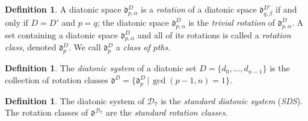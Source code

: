 \documentclass{article}
\theoremstyle{plain}
\theoremstyle{definition}
\newtheorem{definition}[theorem]{Definition}
\theoremstyle{remark}
\begin{document}
\begin{definition}
\label{DEF.Rotation}
	A diatonic space $\mathfrak{d}_{p,\alpha}^D$ is a \textit{rotation} of a diatonic space $\mathfrak{d}_{q,\beta}^{D'}$ if and only if $D=D'$ and $p=q$; the diatonic space $\mathfrak{d}_{p,\alpha}^D$ is the \textit{trivial rotation} of $\mathfrak{d}_{p,\alpha}^D$. A set containing a diatonic space $\mathfrak{d}_{p,\alpha}^D$ and all of its rotations is called a \textit{rotation class}, denoted $\mathfrak{d}_p^D$. We call $\mathfrak{d}_p^D$ a \textit{class of $p$ths}.
\end{definition}

\begin{definition}
\label{DEF.Diatonic System}
	The \textit{diatonic system} of a diatonic set $D=\{d_0,\dots,d_{n-1}\}$ is the collection of rotation classes $\mathfrak{d}^D=\{\mathfrak{d}_p^D\,|\,\gcd{(p-1,n)}=1\}$.
\end{definition}

\begin{definition}
\label{DEF.SDS}
	The diatonic system of $\mathcal{D}_7$ is the \textit{standard diatonic system} (\textit{SDS}). The rotation classes of $\mathfrak{d}^{\mathcal{D}_7}$ are the \textit{standard rotation classes}.
\end{definition}
\end{document}
